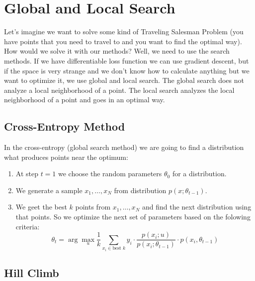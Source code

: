 \chapter{Global and Local Search}

{\sf Let's imagine we want to solve some kind of Traveling Salesman Problem (you have points that you need to travel to and you want to find the optimal way). How would we solve it with our methods? Well, we need to use the search methods. If we have differentiable loss function we can use gradient descent, but if the space is very strange and we don't know how to calculate anything but we want to optimize it, we use global and local search. The global search does not analyze a local neighborhood of a point. The local search analyzes the local neighborhood of a point and goes in an optimal way.}

\section{Cross-Entropy Method}

In the cross-entropy (global search method) we are going to find a distribution what produces points near the optimum:
\begin{enumerate}
	\item At step $t=1$ we choose the random parameters $\theta_0$ for a distribution.
	\item We generate a sample $x_1,\ldots,x_N$ from distribution $p(x;\theta_{t-1})$.
	\item We geet the best $k$ points from $x_1,\ldots,x_N$ and find the next distribution using that points. So we optimize the next set of parameters based on the folowing criteria:
	$$\theta_t=\arg\max\limits_{u}\frac{1}{k}\sum\limits_{x_i\in \text{best }k}y_i\cdot\frac{p(x_i;u)}{p(x_i;\theta_{t-1})}\cdot p(x_i, \theta_{t-1})$$
\end{enumerate}

\section{Hill Climb}

